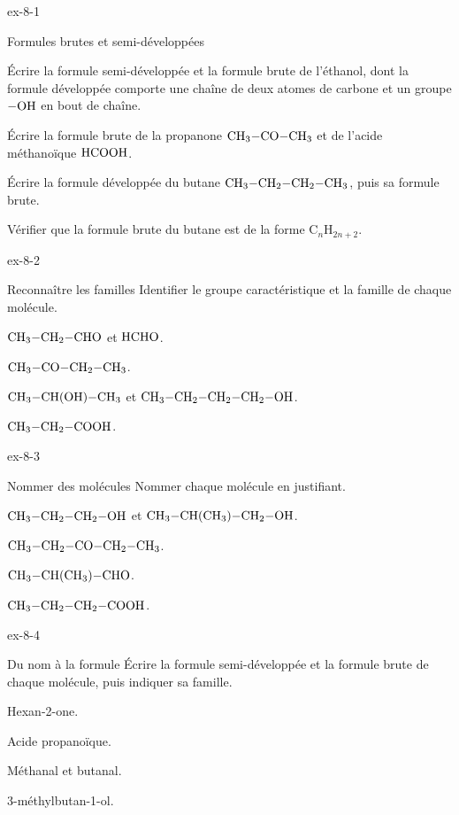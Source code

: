 \begin{blocLivre}{ex-8-1}
\begin{exercice}[1]{Formules brutes et semi-développées}
\begin{questions}
\item Écrire la formule semi-développée et la formule brute de l'éthanol, dont la formule développée comporte une chaîne
de deux atomes de carbone et un groupe $\ce{-OH}$ en bout de chaîne.
\item Écrire la formule brute de la propanone $\ce{CH3-CO-CH3}$ et de l'acide méthanoïque $\ce{HCOOH}$.
\item Écrire la formule développée du butane $\ce{CH3-CH2-CH2-CH3}$, puis sa formule brute.
\item Vérifier que la formule brute du butane est de la forme $\mathrm{C}_n\mathrm{H}_{2n+2}$.
\end{questions}
\end{exercice}
\end{blocLivre}
\begin{blocLivre}{ex-8-2}
\begin{exercice}[1]{Reconnaître les familles}
Identifier le groupe caractéristique et la famille de chaque molécule.
\begin{questions}
\item $\ce{CH3-CH2-CHO}$ et $\ce{HCHO}$.
\item $\ce{CH3-CO-CH2-CH3}$.
\item $\ce{CH3-CH(OH)-CH3}$ et $\ce{CH3-CH2-CH2-CH2-OH}$.
\item $\ce{CH3-CH2-COOH}$.
\end{questions}
\end{exercice}
\end{blocLivre}
\begin{blocLivre}{ex-8-3}
\begin{exercice}[1]{Nommer des molécules}
Nommer chaque molécule en justifiant.
\begin{questions}
\item $\ce{CH3-CH2-CH2-OH}$ et $\ce{CH3-CH(CH3)-CH2-OH}$.
\item $\ce{CH3-CH2-CO-CH2-CH3}$.
\item $\ce{CH3-CH(CH3)-CHO}$.
\item $\ce{CH3-CH2-CH2-COOH}$.
\end{questions}
\end{exercice}
\end{blocLivre}
\begin{blocLivre}{ex-8-4}
\begin{exercice}[1]{Du nom à la formule}
Écrire la formule semi-développée et la formule brute de chaque molécule, puis indiquer sa famille.
\begin{questions}
\item Hexan-2-one.
\item Acide propanoïque.
\item Méthanal et butanal.
\item 3-méthylbutan-1-ol.
\end{questions}
\end{exercice}
\end{blocLivre}
